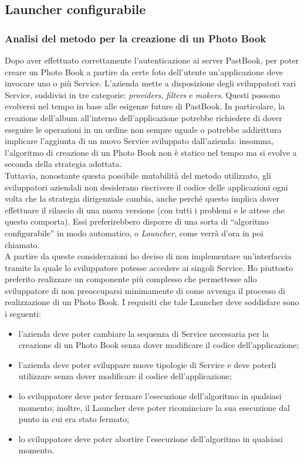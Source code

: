 		\subsection{Launcher configurabile}
			\subsubsection{Analisi del metodo per la creazione di un Photo Book}
				Dopo aver effettuato correttamente l'autenticazione ai server PastBook, per poter creare un Photo Book a partire da
				certe foto dell'utente un'applicazione deve invocare uno o più Service. L'azienda mette a disposizione degli
				sviluppatori vari Service, suddivisi in tre categorie: \emph{providers}, \emph{filters} e \emph{makers}. Questi
				possono evolversi nel tempo in base alle esigenze future di PastBook. In particolare, la creazione dell'album
				all'interno dell'applicazione potrebbe richiedere di dover eseguire le operazioni in un ordine non sempre uguale o
				potrebbe addirittura implicare l'aggiunta di un nuovo Service sviluppato dall'azienda: insomma, l'algoritmo di
				creazione di un Photo Book non è statico nel tempo ma si evolve a seconda della strategia adottata.\\
				Tuttavia, nonostante questa possibile mutabilità del metodo utilizzato, gli sviluppatori aziendali non desiderano
				riscrivere il codice delle applicazioni ogni volta che la strategia dirigenziale cambia, anche perché questo implica
				dover effettuare il rilascio di una nuova versione (con tutti i problemi e le attese che questo comporta). Essi
				preferirebbero disporre di una sorta di “algoritmo configurabile” in modo automatico, o \emph{Launcher}, come verrà
				d'ora in poi chiamato.\\
				A partire da queste considerazioni ho deciso di non implementare un'interfaccia tramite la quale lo sviluppatore
				potesse accedere ai singoli Service. Ho piuttosto preferito realizzare un componente più complesso che permettesse
				allo sviluppatore di non preoccuparsi minimamente di come avvenga il processo di realizzazione di un Photo Book. I
				requisiti che tale Launcher deve soddisfare sono i seguenti:
				\begin{itemize}
					\item l'azienda deve poter cambiare la sequenza di Service necessaria per la creazione di un Photo Book
					senza dover modificare il codice dell'applicazione;
					\item l'azienda deve poter sviluppare nuove tipologie di Service e deve poterli utilizzare senza dover
					modificare il codice dell'applicazione;
					\item lo sviluppatore deve poter fermare l'esecuzione dell'algoritmo in qualsiasi momento; inoltre, il
					Launcher deve poter ricominciare la sua esecuzione dal punto in cui era stato fermato;
					\item lo sviluppatore deve poter abortire l'esecuzione dell'algoritmo in qualsiasi momento.
				\end{itemize}
